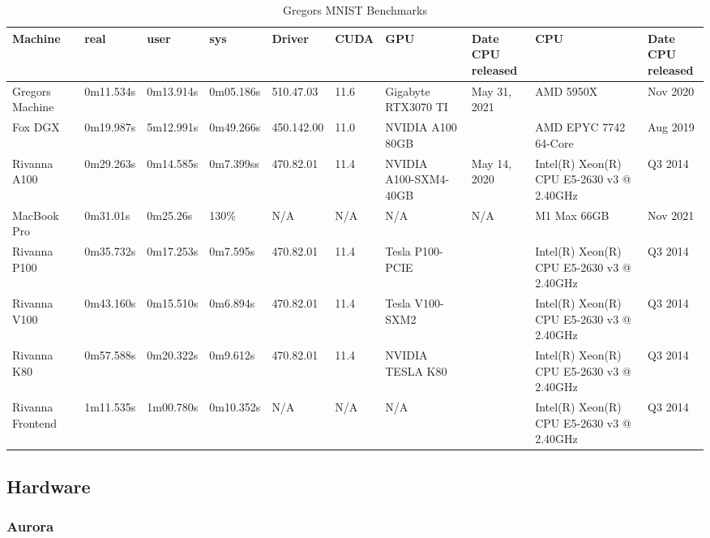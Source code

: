 \documentclass[sigplan,screen]{acmart}
\begin{document}
\begin{table*}[!ht]
\caption{Gregors MNIST Benchmarks}\label{tab:mnist}
    \centering
      \begin{adjustbox}{max width=\textwidth}
    \begin{tabular}{|l|l|l|l|l|l|l|l|l|l|}
    \hline
        Machine & real & user & sys & Driver & CUDA & GPU & \makecell{Date CPU \\released} & CPU & \makecell{Date CPU \\released} \\ \hline
        Gregors Machine & 0m11.534s & 0m13.914s & 0m05.186s & 510.47.03 & 11.6 & Gigabyte RTX3070 TI & May 31, 2021 & AMD 5950X & Nov 2020 \\ \hline
        Fox DGX & 0m19.987s & 5m12.991s & 0m49.266s & 450.142.00 & 11.0 & NVIDIA A100 80GB & & AMD EPYC 7742 64-Core & Aug 2019 \\ \hline
        Rivanna A100 & 0m29.263s & 0m14.585s & 0m7.399ss & 470.82.01 & 11.4 & NVIDIA A100-SXM4-40GB & May 14, 2020 & Intel(R) Xeon(R) CPU E5-2630 v3 @ 2.40GHz & Q3  2014 \\ \hline
        MacBook Pro & 0m31.01s & 0m25.26s & 130\% & N/A & N/A & N/A & N/A & M1 Max 66GB & Nov 2021 \\ \hline
        Rivanna P100 & 0m35.732s & 0m17.253s & 0m7.595s & 470.82.01 & 11.4 & Tesla P100-PCIE & & Intel(R) Xeon(R) CPU E5-2630 v3 @ 2.40GHz & Q3  2014 \\ \hline
        Rivanna V100 & 0m43.160s & 0m15.510s & 0m6.894s & 470.82.01 & 11.4 & Tesla V100-SXM2 & & Intel(R) Xeon(R) CPU E5-2630 v3 @ 2.40GHz & Q3  2014 \\ \hline
        Rivanna K80 & 0m57.588s & 0m20.322s & 0m9.612s & 470.82.01 & 11.4 & NVIDIA TESLA K80 & & Intel(R) Xeon(R) CPU E5-2630 v3 @ 2.40GHz & Q3  2014 \\ \hline
        Rivanna Frontend & 1m11.535s & 1m00.780s & 0m10.352s & N/A & N/A & N/A & & Intel(R) Xeon(R) CPU E5-2630 v3 @ 2.40GHz & Q3  2014 \\ \hline
    \end{tabular}
    \end{adjustbox}
\end{table*}

\subsection{Hardware}

\subsubsection{Aurora}
\label{id:anl} 
\end{document}

